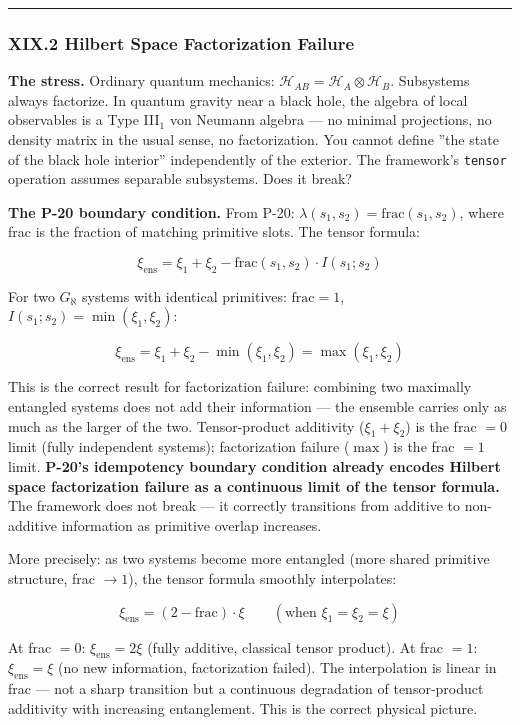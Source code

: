 \documentclass[12pt,a4paper]{article}
\begin{document}
\begin{center}
\rule{0.5\textwidth}{0.4pt}
\end{center}

\subsubsection{XIX.2 Hilbert Space Factorization Failure}

\textbf{The stress.} Ordinary quantum mechanics: $\mathcal{H}_{AB} = \mathcal{H}_A \otimes \mathcal{H}_B$. Subsystems always factorize. In quantum gravity near a black hole, the algebra of local observables is a Type III$_1$ von Neumann algebra --- no minimal projections, no density matrix in the usual sense, no factorization. You cannot define ''the state of the black hole interior'' independently of the exterior. The framework's \texttt{tensor} operation assumes separable subsystems. Does it break?

\textbf{The P-20 boundary condition.} From P-20: $\lambda(s_1, s_2) = \text{frac}(s_1, s_2)$, where frac is the fraction of matching primitive slots. The tensor formula:

\[\xi_{\text{ens}} = \xi_1 + \xi_2 - \text{frac}(s_1, s_2) \cdot I(s_1; s_2)\]

For two $G_{\aleph}$ systems with identical primitives: $\text{frac} = 1$, $I(s_1; s_2) = \min(\xi_1, \xi_2)$:

\[\xi_{\text{ens}} = \xi_1 + \xi_2 - \min(\xi_1, \xi_2) = \max(\xi_1, \xi_2)\]

This is the correct result for factorization failure: combining two maximally entangled systems does not add their information --- the ensemble carries only as much as the larger of the two. Tensor-product additivity ($\xi_1 + \xi_2$) is the frac $= 0$ limit (fully independent systems); factorization failure ($\max$) is the frac $= 1$ limit. \textbf{P-20's idempotency boundary condition already encodes Hilbert space factorization failure as a continuous limit of the tensor formula.} The framework does not break --- it correctly transitions from additive to non-additive information as primitive overlap increases.

More precisely: as two systems become more entangled (more shared primitive structure, frac $\to 1$), the tensor formula smoothly interpolates:

\[\xi_{\text{ens}} = (2 - \text{frac}) \cdot \xi \qquad (\text{when } \xi_1 = \xi_2 = \xi)\]

At frac $= 0$: $\xi_{\text{ens}} = 2\xi$ (fully additive, classical tensor product). At frac $= 1$: $\xi_{\text{ens}} = \xi$ (no new information, factorization failed). The interpolation is linear in frac --- not a sharp transition but a continuous degradation of tensor-product additivity with increasing entanglement. This is the correct physical picture.
\end{document}
